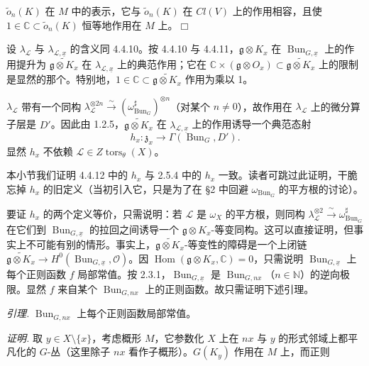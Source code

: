 
$\tilde{o}_{n}(K)$ 在 $M$ 中的表示，它与 $\tilde{o}_{n}(K)$ 在 $Cl(V)$ 上的作用相容，且使 $1\in\mathbb{C}\subset\tilde{o}_{n}(K)$ 恒等地作用在 $M$ 上。\hfill$\Box$

 设 $\lambda_{\mathcal{L}}$ 与 $\lambda_{\mathcal{L},\underline{x}}$ 的含义同 4.4.10。按 4.4.10 与 4.4.11，$\mathfrak{g}\otimes K_{x}$ 在 $\operatorname{Bun}_{G,\underline{x}}$ 上的作用提升为 $\widetilde{\mathfrak{g}\otimes K_{x}}$ 在 $\lambda_{\mathcal{L},\underline{x}}$ 上的典范作用；它在 $\mathbb{C}\times(\mathfrak{g}\otimes O_{x})\subset\widetilde{\mathfrak{g}\otimes K_{x}}$ 上的限制是显然的那个。特别地，$1\in\mathbb{C}\subset\widetilde{\mathfrak{g}\otimes K_{x}}$ 作用为乘以 1。

$\lambda_{\mathcal{L}}$ 带有一个同构 $\lambda_{\mathcal{L}}^{\otimes 2n}\xrightarrow{\ \sim\ }(\omega^{\sharp}_{\operatorname{Bun}_{G}})^{\otimes n}$（对某个 $n\ne 0$），故作用在 $\lambda_{\mathcal{L}}$ 上的微分算子层是 $D'$。因此由 1.2.5，$\widetilde{\mathfrak{g}\otimes K_{x}}$ 在 $\lambda_{\mathcal{L},\underline{x}}$ 上的作用诱导一个典范态射
\[
h_{x}:\mathfrak{z}_{x}\to\Gamma(\operatorname{Bun}_{G},D').
\]
显然 $h_{x}$ 不依赖 $\mathcal{L}\in Z\operatorname{tors}_{\theta}(X)$。

 本小节我们证明 4.4.12 中的 $h_{x}$ 与 2.5.4 中的 $h_{x}$ 一致。读者可跳过此证明，干脆忘掉 $h_{x}$ 的旧定义（当初引入它，只是为了在 §2 中回避 $\omega_{\operatorname{Bun}_{G}}$ 的平方根的讨论）。

要证 $h_{x}$ 的两个定义等价，只需说明：若 $\mathcal{L}$ 是 $\omega_{X}$ 的平方根，则同构 $\lambda_{\mathcal{L}}^{\otimes 2}\xrightarrow{\ \sim\ }\omega^{\sharp}_{\operatorname{Bun}_{G}}$ 在它们到 $\operatorname{Bun}_{G,\underline{x}}$ 的拉回之间诱导一个 $\mathfrak{g}\otimes K_{x}$-等变同构。这可以直接证明，但事实上不可能有别的情形。事实上，$\widetilde{\mathfrak{g}\otimes K_{x}}$-等变性的障碍是一个上闭链 $\widetilde{\mathfrak{g}\otimes K_{x}}\to H^{0}(\operatorname{Bun}_{G,\underline{x}},\mathcal{O})$。因 $\operatorname{Hom}(\mathfrak{g}\otimes K_{x},\mathbb{C})=0$，只需说明 $\operatorname{Bun}_{G,\underline{x}}$ 上每个正则函数 $f$ 局部常值。按 2.3.1，$\operatorname{Bun}_{G,\underline{x}}$ 是 $\operatorname{Bun}_{G,nx}$（$n\in\mathbb{N}$）的逆向极限。显然 $f$ 来自某个 $\operatorname{Bun}_{G,nx}$ 上的正则函数。故只需证明下述引理。

\emph{引理.} $\operatorname{Bun}_{G,nx}$ 上每个正则函数局部常值。

\emph{证明.} 取 $y\in X\setminus\{x\}$，考虑概形 $M$，它参数化 $X$ 上在 $nx$ 与 $y$ 的形式邻域上都平凡化的 $G$-丛（这里除子 $nx$ 看作子概形）。$G(K_{y})$ 作用在 $M$ 上，而正则

